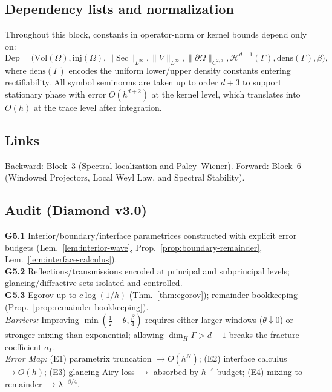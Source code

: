 \subsection{Dependency lists and normalization}
\label{subsec:dependency-normalization}
Throughout this block, constants in operator-norm or kernel bounds depend only on:
\[
\mathrm{Dep} = \Big(\mathrm{Vol}(\Omega), \mathrm{inj}(\Omega), \|\mathrm{Sec}\|_{L^\infty},
\|\!V\!\|_{L^\infty}, \|\partial\Omega\|_{C^{2,\alpha}}, \mathcal{H}^{d-1}(\Gamma), \text{dens}(\Gamma),\beta \Big),
\]
where $\text{dens}(\Gamma)$ encodes the uniform lower/upper density constants entering rectifiability. All symbol seminorms are taken up to order $d+3$ to support stationary phase with error $O(h^{d+2})$ at the kernel level, which translates into $O(h)$ at the trace level after integration.

\subsection*{Links}
Backward: Block~3 (Spectral localization and Paley--Wiener).
Forward: Block~6 (Windowed Projectors, Local Weyl Law, and Spectral Stability).

\subsection*{Audit (Diamond v3.0)}
\begin{auditblock}
\textbf{G5.1} Interior/boundary/interface parametrices constructed with explicit error budgets (Lem.~\ref{lem:interior-wave}, Prop.~\ref{prop:boundary-remainder}, Lem.~\ref{lem:interface-calculus}).\\
\textbf{G5.2} Reflections/transmissions encoded at principal and subprincipal levels; glancing/diffractive sets isolated and controlled.\\
\textbf{G5.3} Egorov up to $c\log(1/h)$ (Thm.~\ref{thm:egorov}); remainder bookkeeping (Prop.~\ref{prop:remainder-bookkeeping}).\\[4pt]
\emph{Barriers:} Improving $\min(\frac12-\theta,\frac{\beta}{4})$ requires either larger windows ($\theta\downarrow 0$) or stronger mixing than exponential; allowing $\dim_H\Gamma>d-1$ breaks the fracture coefficient $a_\Gamma$.\\
\emph{Error Map:} (E1) parametrix truncation $\to O(h^N)$; (E2) interface calculus $\to O(h)$; (E3) glancing Airy loss $\to$ absorbed by $h^{-\varepsilon}$-budget; (E4) mixing-to-remainder $\to \lambda^{-\beta/4}$.
\end{auditblock}

